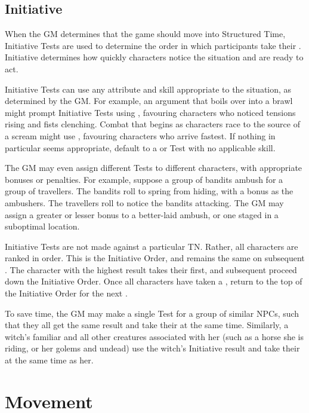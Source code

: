 \subsection{Initiative}

When the GM determines that the game should move into Structured Time, Initiative Tests are used to determine the order in which participants take their {\turns}.
Initiative determines how quickly characters notice the situation and are ready to act.

Initiative Tests can use any attribute and skill appropriate to the situation, as determined by the GM.
For example, an argument that boils over into a brawl might prompt Initiative Tests using , favouring characters who noticed tensions rising and fists clenching.
Combat that begins as characters race to the source of a scream might use , favouring characters who arrive fastest.
If nothing in particular seems appropriate, default to a  or  Test with no applicable skill.

The GM may even assign different Tests to different characters, with appropriate bonuses or penalties.
For example, suppose a group of bandits ambush for a group of travellers.
The bandits roll  to spring from hiding, with a  bonus as the ambushers.
The travellers roll  to notice the bandits attacking.
The GM may assign a greater or lesser bonus to a better-laid ambush, or one staged in a suboptimal location.

Initiative Tests are not made against a particular TN.
Rather, all characters are ranked in order.
This is the Initiative Order, and remains the same on subsequent {\rounds}.
The character with the highest result takes their {\turn} first, and subsequent {\turns} proceed down the Initiative Order.
Once all characters have taken a {\turn}, return to the top of the Initiative Order for the next {\round}.

To save time, the GM may make a single Test for a group of similar NPCs, such that they all get the same result and take their {\turns} at the same time.
Similarly, a witch's familiar and all other creatures associated with her (such as a horse she is riding, or her golems and undead) use the witch's Initiative result and take their {\turns} at the same time as her.

\section{Movement}

